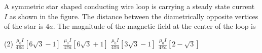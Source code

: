 

    \item A symmetric star shaped conducting wire loop is carrying a steady state current \( I \) as shown in the figure. The distance between the diametrically opposite vertices of the star is \( 4a \). The magnitude of the magnetic field at the center of the loop is
        \begin{tasks}(2)
            \task \(\frac{\mu_0 I}{4\pi a} [6\sqrt{3} - 1]\)
            \task \(\frac{\mu_0 I}{4\pi a} [6\sqrt{3} + 1]\)
            \task \(\frac{\mu_0 I}{4\pi a} [3\sqrt{3} - 1]\)
            \task \(\frac{\mu_0 I}{4\pi a} [2 - \sqrt{3}]\)
        \end{tasks}

\begin{center}
\end{center}
